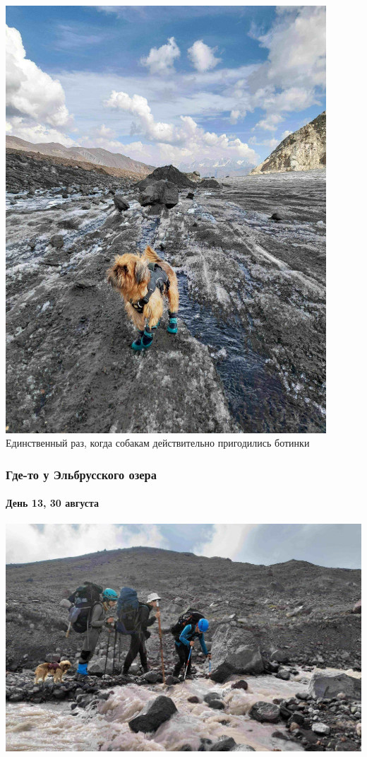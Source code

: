 \begin{frame}
{\begin{minipage}{\fourpicsize}
			\includegraphics[width=0.9\textwidth]{../pics/20240830_155136.jpg}			
			Единственный раз, когда собакам действительно пригодились ботинки
		\end{minipage}
		\vfill
	}
\end{frame}

\begin{frame}
	\frametitle{Где-то у Эльбрусского озера}
	\framesubtitle{День 13, 30 августа}	
	\centering
	\includegraphics[width=\textwidth]{../pics/20240830_162252}			
\end{frame}

